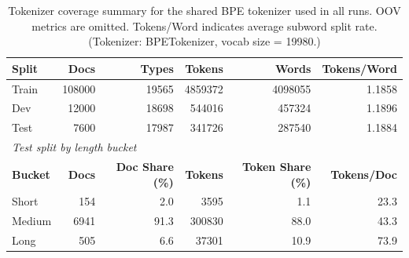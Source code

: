 \begin{table}[h]
\centering
\small
\begin{tabular}{lrrrrr}
\toprule
\textbf{Split} & \textbf{Docs} & \textbf{Types} & \textbf{Tokens} & \textbf{Words} & \textbf{Tokens/Word} \\
\midrule
Train & 108000 & 19565 & 4859372 & 4098055 & 1.1858 \\
Dev & 12000 & 18698 & 544016 & 457324 & 1.1896 \\
Test & 7600 & 17987 & 341726 & 287540 & 1.1884 \\
\midrule
\multicolumn{6}{l}{\textit{Test split by length bucket}} \\
\textbf{Bucket} & \textbf{Docs} & \textbf{Doc Share (\%)} & \textbf{Tokens} & \textbf{Token Share (\%)} & \textbf{Tokens/Doc} \\
\midrule
Short & 154 & 2.0 & 3595 & 1.1 & 23.3 \\
Medium & 6941 & 91.3 & 300830 & 88.0 & 43.3 \\
Long & 505 & 6.6 & 37301 & 10.9 & 73.9 \\
\bottomrule
\end{tabular}
\caption{Tokenizer coverage summary for the shared BPE tokenizer used in all runs. OOV metrics are omitted. Tokens/Word indicates average subword split rate. (Tokenizer: BPETokenizer, vocab size = 19980.)}
\label{tab:tokenizer_coverage}
\end{table}
